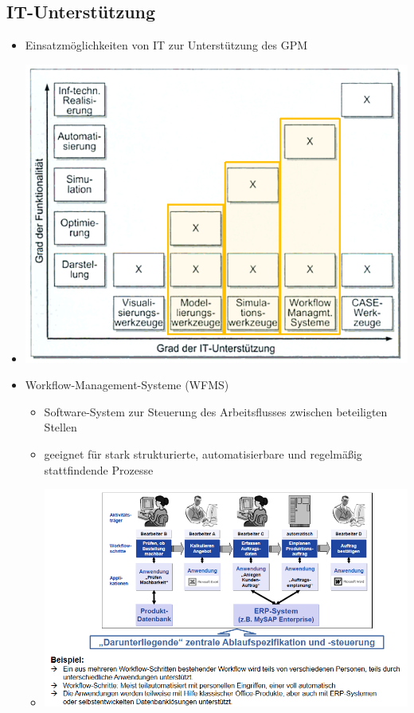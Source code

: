 \documentclass[11pt,a4paper]{article}
\begin{document}
\subsection{IT-Unterstützung}
\begin{itemize}
\item Einsatzmöglichkeiten von IT zur Unterstützung des GPM
\item[] \includegraphics[width=15cm]{itsup}
\item Workflow-Management-Systeme (WFMS)
	\begin{itemize}
	\item Software-System zur Steuerung des Arbeitsflusses zwischen beteiligten Stellen
	\item geeignet für stark strukturierte, automatisierbare und regelmäßig stattfindende Prozesse 
	\item[] \includegraphics[width=15cm]{wfms}
	\end{itemize}
\end{itemize}
\end{document}
